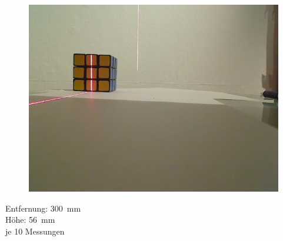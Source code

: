 \documentclass[xcolor=dvipsnames]{beamer}
\begin{document}
\begin{frame}
\begin{figure}
\begin{minipage}{0.32\linewidth}
			\includegraphics[width=\linewidth]{includes/test_color_3}
		\end{minipage}
	\end{figure}

	Entfernung: 300~mm\\
	Höhe: 56~mm\\
	je 10 Messungen

\end{frame}
\end{document}
